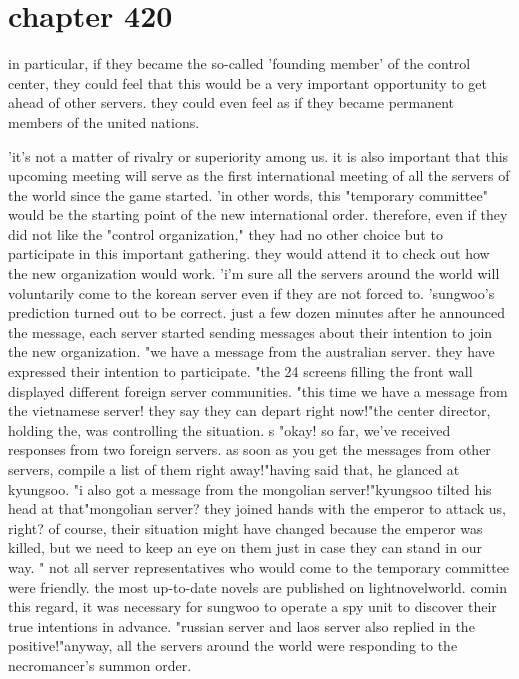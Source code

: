 \section{chapter 420}

in particular, if they became the so-called 'founding member' of the control center, they could feel that this would be a very important opportunity to get ahead of other servers.
 they could even feel as if they became permanent members of the united nations.





'it's not a matter of rivalry or superiority among us.
 it is also important that this upcoming meeting will serve as the first international meeting of all the servers of the world since the game started.
'in other words, this "temporary committee" would be the starting point of the new international order.
 therefore, even if they did not like the "control organization," they had no other choice but to participate in this important gathering.
 they would attend it to check out how the new organization would work.
 'i'm sure all the servers around the world will voluntarily come to the korean server even if they are not forced to.
'sungwoo's prediction turned out to be correct.
just a few dozen minutes after he announced the message, each server started sending messages about their intention to join the new organization.
"we have a message from the australian server.
 they have expressed their intention to participate.
"the 24 screens filling the front wall displayed different foreign server communities.
"this time we have a message from the vietnamese server! they say they can depart right now!"the center director, holding the, was controlling the situation.
s "okay! so far, we've received responses from two foreign servers.
 as soon as you get the messages from other servers, compile a list of them right away!"having said that, he glanced at kyungsoo.
"i also got a message from the mongolian server!"kyungsoo tilted his head at that"mongolian server? they joined hands with the emperor to attack us, right? of course, their situation might have changed because the emperor was killed, but we need to keep an eye on them just in case they can stand in our way.
"
not all server representatives who would come to the temporary committee were friendly.
the most up-to-date novels are published on lightnov­elworld.
comin this regard, it was necessary for sungwoo to operate a spy unit to discover their true intentions in advance.
"russian server and laos server also replied in the positive!"anyway, all the servers around the world were responding to the necromancer's summon order.
